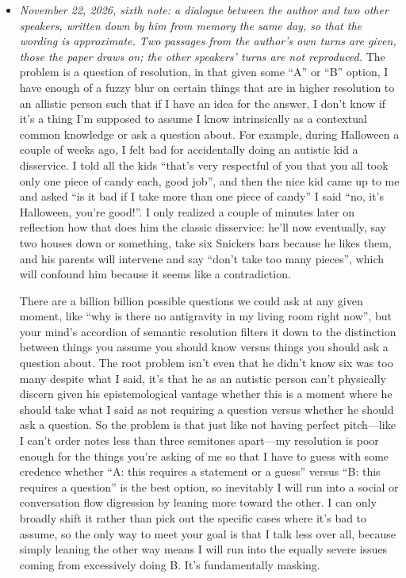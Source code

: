 \begin{itemize}
\item \emph{November 22, 2026, sixth note: a dialogue between the author and two other speakers, written down by him from memory the same day, so that the wording is approximate. Two passages from the author's own turns are given, those the paper draws on; the other speakers' turns are not reproduced.} The problem is a question of resolution, in that given some ``A'' or ``B'' option, I have enough of a fuzzy blur on certain things that are in higher resolution to an allistic person such that if I have an idea for the answer, I don't know if it's a thing I'm supposed to assume I know intrinsically as a contextual common knowledge or ask a question about. For example, during Halloween a couple of weeks ago, I felt bad for accidentally doing an autistic kid a disservice. I told all the kids ``that's very respectful of you that you all took only one piece of candy each, good job'', and then the nice kid came up to me and asked ``is it bad if I take more than one piece of candy'' I said ``no, it's Halloween, you're good!''. I only realized a couple of minutes later on reflection how that does him the classic disservice: he'll now eventually, say two houses down or something, take six Snickers bars because he likes them, and his parents will intervene and say ``don't take too many pieces'', which will confound him because it seems like a contradiction. \par [\ldots] \par There are a billion billion possible questions we could ask at any given moment, like ``why is there no antigravity in my living room right now'', but your mind's accordion of semantic resolution filters it down to the distinction between things you assume you should know versus things you should ask a question about. The root problem isn't even that he didn't know six was too many despite what I said, it's that he as an autistic person can't physically discern given his epistemological vantage whether this is a moment where he should take what I said as not requiring a question versus whether he should ask a question. So the problem is that just like not having perfect pitch---like I can't order notes less than three semitones apart---my resolution is poor enough for the things you're asking of me so that I have to guess with some credence whether ``A: this requires a statement or a guess'' versus ``B: this requires a question'' is the best option, so inevitably I will run into a social or conversation flow digression by leaning more toward the other. I can only broadly shift it rather than pick out the specific cases where it's bad to assume, so the only way to meet your goal is that I talk less over all, because simply leaning the other way means I will run into the equally severe issues coming from excessively doing B. It's fundamentally masking.

\end{itemize}
